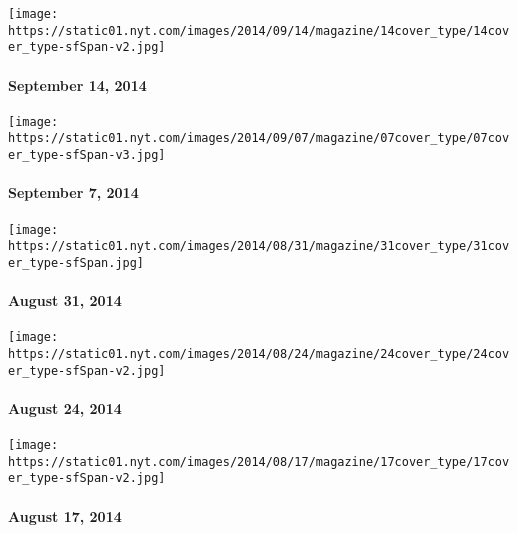 \href{http://www.nytimes.com/indexes/2014/09/14/magazine/index.html}{}

\texttt{[image: https://static01.nyt.com/images/2014/09/14/magazine/14cover\_type/14cover\_type-sfSpan-v2.jpg]}

\hypertarget{september-14-2014}{%
\paragraph{September 14, 2014}\label{september-14-2014}}

\href{http://www.nytimes.com/indexes/2014/09/07/magazine/index.html}{}

\texttt{[image: https://static01.nyt.com/images/2014/09/07/magazine/07cover\_type/07cover\_type-sfSpan-v3.jpg]}

\hypertarget{september-7-2014}{%
\paragraph{September 7, 2014}\label{september-7-2014}}

\href{http://www.nytimes.com/indexes/2014/08/31/magazine/index.html}{}

\texttt{[image: https://static01.nyt.com/images/2014/08/31/magazine/31cover\_type/31cover\_type-sfSpan.jpg]}

\hypertarget{august-31-2014}{%
\paragraph{August 31, 2014}\label{august-31-2014}}

\href{http://www.nytimes.com/indexes/2014/08/24/magazine/index.html}{}

\texttt{[image: https://static01.nyt.com/images/2014/08/24/magazine/24cover\_type/24cover\_type-sfSpan-v2.jpg]}

\hypertarget{august-24-2014}{%
\paragraph{August 24, 2014}\label{august-24-2014}}

\href{http://www.nytimes.com/indexes/2014/08/17/magazine/index.html}{}

\texttt{[image: https://static01.nyt.com/images/2014/08/17/magazine/17cover\_type/17cover\_type-sfSpan-v2.jpg]}

\hypertarget{august-17-2014}{%
\paragraph{August 17, 2014}\label{august-17-2014}}

